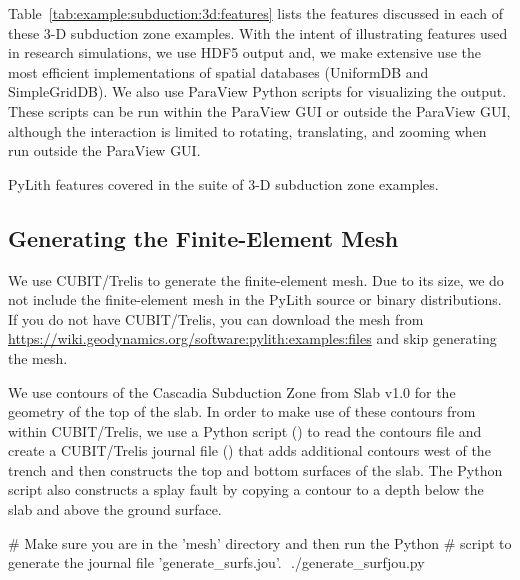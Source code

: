 Table~\ref{tab:example:subduction:3d:features} lists the features
discussed in each of these 3-D subduction zone examples. With the
intent of illustrating features used in research simulations, we use
HDF5 output and, we make extensive use the most efficient
implementations of spatial databases (UniformDB and SimpleGridDB). We
also use ParaView Python scripts for visualizing the output. These
scripts can be run within the ParaView GUI or outside the ParaView
GUI, although the interaction is limited to rotating, translating, and
zooming when run outside the ParaView GUI.

\begin{table}[htbp]
  \caption{PyLith features covered in the suite of 3-D subduction zone examples.}
  \label{tab:example:subduction:3d:features}
  
\end{table}

\subsection{Generating the Finite-Element Mesh}

We use CUBIT/Trelis to generate the finite-element mesh. Due to its
size, we do not include the finite-element mesh in the PyLith source
or binary distributions. If you do not have CUBIT/Trelis, you can
download the mesh from
\url{https://wiki.geodynamics.org/software:pylith:examples:files} and
skip generating the mesh.

We use contours of the Cascadia Subduction Zone from Slab v1.0
\cite{Hayes:etal:2012} for the geometry of the top of the slab. In
order to make use of these contours from within CUBIT/Trelis, we use a
Python script () to read the contours
file and create a CUBIT/Trelis journal file
() that adds additional contours west of
the trench and then constructs the top and bottom surfaces of the
slab. The Python script also constructs a splay fault by copying a
contour to a depth below the slab and above the ground surface.


\begin{shell}
# Make sure you are in the 'mesh' directory and then run the Python
# script to generate the journal file 'generate_surfs.jou'.
$$ ./generate_surfjou.py  
\end{shell}

